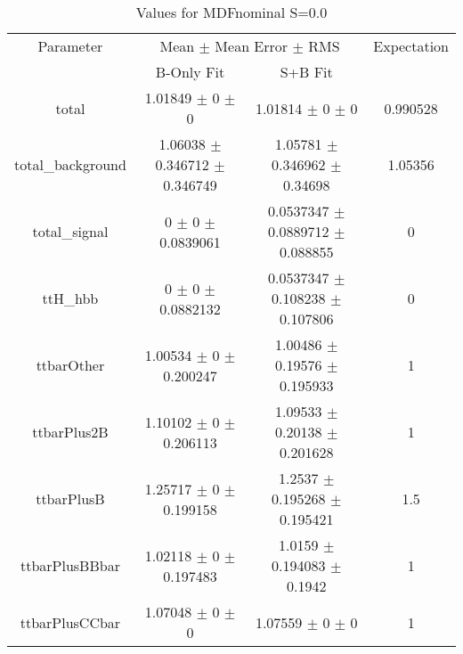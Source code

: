 \begin{table}
\centering
\caption{Values for MDFnominal S=0.0}
\begin{tabular}{cccc}
\toprule
Parameter & \multicolumn{2}{c}{Mean $\pm$ Mean Error $\pm$ RMS} & Expectation\\
 & B-Only Fit & S+B Fit & \\
\midrule
total & \num{1.01849} $\pm$ \num{0} $\pm$ \num{0} & \num{1.01814} $\pm$ \num{0} $\pm$ \num{0} & \num{0.990528}\\
total\_background & \num{1.06038} $\pm$ \num{0.346712} $\pm$ \num{0.346749} & \num{1.05781} $\pm$ \num{0.346962} $\pm$ \num{0.34698} & \num{1.05356}\\
total\_signal & \num{0} $\pm$ \num{0} $\pm$ \num{0.0839061} & \num{0.0537347} $\pm$ \num{0.0889712} $\pm$ \num{0.088855} & \num{0}\\
ttH\_hbb & \num{0} $\pm$ \num{0} $\pm$ \num{0.0882132} & \num{0.0537347} $\pm$ \num{0.108238} $\pm$ \num{0.107806} & \num{0}\\
ttbarOther & \num{1.00534} $\pm$ \num{0} $\pm$ \num{0.200247} & \num{1.00486} $\pm$ \num{0.19576} $\pm$ \num{0.195933} & \num{1}\\
ttbarPlus2B & \num{1.10102} $\pm$ \num{0} $\pm$ \num{0.206113} & \num{1.09533} $\pm$ \num{0.20138} $\pm$ \num{0.201628} & \num{1}\\
ttbarPlusB & \num{1.25717} $\pm$ \num{0} $\pm$ \num{0.199158} & \num{1.2537} $\pm$ \num{0.195268} $\pm$ \num{0.195421} & \num{1.5}\\
ttbarPlusBBbar & \num{1.02118} $\pm$ \num{0} $\pm$ \num{0.197483} & \num{1.0159} $\pm$ \num{0.194083} $\pm$ \num{0.1942} & \num{1}\\
ttbarPlusCCbar & \num{1.07048} $\pm$ \num{0} $\pm$ \num{0} & \num{1.07559} $\pm$ \num{0} $\pm$ \num{0} & \num{1}\\
\bottomrule
\end{tabular}
\end{table}